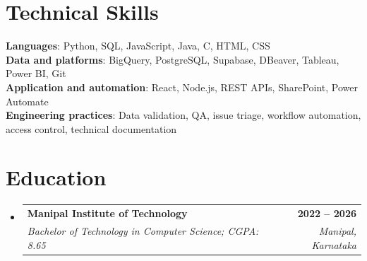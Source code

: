 \documentclass[letterpaper,11pt]{article}
\makeatletter
\newcommand{\resumeSubheading}[4]{
  \vspace{-2pt}\item
    \begin{tabular*}{1.0\textwidth}[t]{l@{\extracolsep{\fill}}r}
      \textbf{#1} & \textbf{\small #2} \\
      \textit{\small #3} & \textit{\small #4} \\
    \end{tabular*}\vspace{-8pt}
}
\newcommand{\resumeSubHeadingListStart}{\begin{itemize}[leftmargin=0.0in,label={}]}
\newcommand{\resumeSubHeadingListEnd}{\end{itemize}}
\makeatother
\begin{document}
\section{Technical Skills}
\begin{itemize}[leftmargin=0.15in,label={}]
  \small{\item{
    \textbf{Languages}{: Python, SQL, JavaScript, Java, C, HTML, CSS} \\
    \textbf{Data and platforms}{: BigQuery, PostgreSQL, Supabase, DBeaver, Tableau, Power BI, Git} \\
    \textbf{Application and automation}{: React, Node.js, REST APIs, SharePoint, Power Automate} \\
    \textbf{Engineering practices}{: Data validation, QA, issue triage, workflow automation, access control, technical documentation}
  }}
\end{itemize}

\section{Education}
\resumeSubHeadingListStart
  \resumeSubheading
    {Manipal Institute of Technology}{2022 -- 2026}
    {Bachelor of Technology in Computer Science; CGPA: 8.65}{Manipal, Karnataka}
\resumeSubHeadingListEnd
\end{document}
